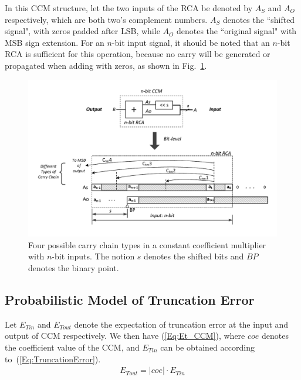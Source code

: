\documentclass[prodmode,acmtrets]{acmsmall} %
\begin{document}
In this CCM structure, let the two inputs of the RCA be denoted by $A_S$ and $A_O$ respectively, which are both two's complement numbers. $A_S$ denotes the ``shifted signal", with zeros padded after LSB, while $A_O$ denotes the ``original signal" with MSB sign extension. For an $n$-bit input signal, it should be noted that an $n$-bit RCA is sufficient for this operation, because no carry will be generated or propagated when adding with zeros, as shown in Fig.~\ref{CCM_fig}.
%
\begin{figure}[htbp]
  \vspace{-2ex}
  \centering
  \includegraphics[width=\textwidth]{./Figures/CCM_CarryChain.pdf}
  \vspace{-6ex}
  \caption{Four possible carry chain types in a constant coefficient multiplier with $n$-bit inputs. The notion $s$ denotes the shifted bits and $BP$ denotes the binary point.}
  \label{CCM_fig}
\end{figure}

\subsection{Probabilistic Model of Truncation Error}
Let $E_{Tin}$ and $E_{Tout}$ denote the expectation of truncation error at the input and output of CCM respectively. We then have (\ref{Eq:Et_CCM}), where $coe$ denotes the coefficient value of the CCM, and $E_{Tin}$ can be obtained according to~(\ref{Eq:TruncationError}).
%
\begin{eqnarray}\label{Eq:Et_CCM}
  E_{Tout}=|coe|\cdot E_{Tin}
\end{eqnarray}
\end{document}
